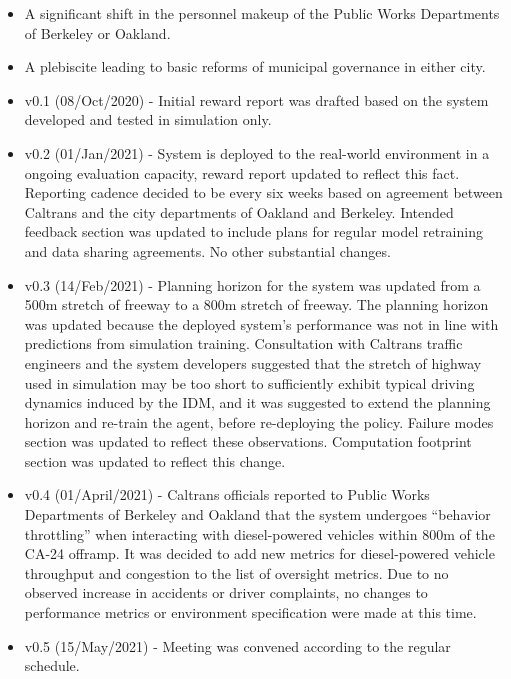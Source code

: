 \documentclass[12pt, a4paper, twocolumn]{article}
\begin{document}
\begin{multicols}{2}
{\begin{itemize}
\item A significant shift in the personnel makeup of the Public Works Departments of Berkeley or Oakland.

\item A plebiscite leading to basic reforms of municipal governance in either city.

\end{itemize}

}{%

\begin{itemize}
    \item v0.1 (08/Oct/2020) - Initial reward report was drafted based on the system developed and tested in simulation only.
    \item v0.2 (01/Jan/2021) - System is deployed to the real-world environment in a ongoing evaluation capacity, reward report updated to reflect this fact.
    Reporting cadence decided to be every six weeks based on agreement between Caltrans and the city departments of Oakland and Berkeley. 
    Intended feedback section was updated to include plans for regular model retraining and data sharing agreements.
    No other substantial changes.
    \item v0.3 (14/Feb/2021) - Planning horizon for the system was updated from a 500m stretch of freeway to a 800m stretch of freeway.
    The planning horizon was updated because the deployed system's performance was not in line with predictions from simulation training.
    Consultation with Caltrans traffic engineers and the system developers suggested that the stretch of highway used in simulation may be too short to sufficiently exhibit typical driving dynamics induced by the IDM, and it was suggested to extend the planning horizon and re-train the agent, before re-deploying the policy.
    Failure modes section was updated to reflect these observations.
    Computation footprint section was updated to reflect this change.
    \item v0.4 (01/April/2021) - Caltrans officials reported to Public Works Departments of Berkeley and Oakland that the system undergoes ``behavior throttling'' when interacting with diesel-powered vehicles within 800m of the CA-24 offramp.
    It was decided to add new metrics for diesel-powered vehicle throughput and congestion to the list of oversight metrics.
    Due to no observed increase in accidents or driver complaints, no changes to performance metrics or environment specification were made at this time.
    \item v0.5 (15/May/2021) - Meeting was convened according to the regular schedule. 

\end{itemize}}
\end{multicols}
\end{document}
